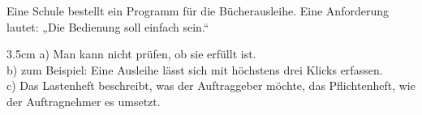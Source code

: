 \question[3]
Eine Schule bestellt ein Programm für die Bücherausleihe. Eine Anforderung lautet: „Die Bedienung soll einfach sein.“
\begin{solutionbox}{3.5cm}
a) Man kann nicht prüfen, ob sie erfüllt ist. \\
b) zum Beispiel: Eine Ausleihe lässt sich mit höchstens drei Klicks erfassen. \\
c) Das Lastenheft beschreibt, was der Auftraggeber möchte, das Pflichtenheft, wie der Auftragnehmer es umsetzt.
\end{solutionbox}
